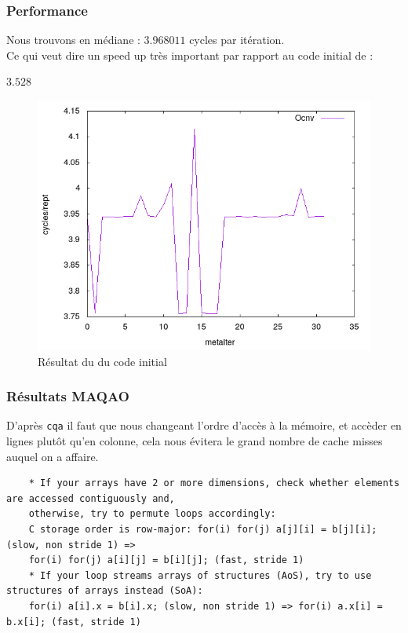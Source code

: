 \documentclass{report}
\begin{document}
  \subsubsection{Performance}
  Nous trouvons en médiane : $3.968011$ cycles par itération.\\
  Ce qui veut dire un speed up très important par rapport au code initial de :
  \begin{center}
      $3.528$
  \end{center}
  \begin{figure}[ht!]
    \centering
    \includegraphics[scale=0.45]{../metarep/Ocnv.png}
    \caption{Résultat du du code initial}
  \end{figure}
  \subsubsection{Résultats MAQAO}
  D'après \texttt{cqa} il faut que nous changeant l'ordre d'accès à la mémoire, et accèder en lignes
  plutôt qu'en colonne, cela nous évitera le grand nombre de cache misses auquel on a affaire.
  \begin{verbatim}
    * If your arrays have 2 or more dimensions, check whether elements are accessed contiguously and,
    otherwise, try to permute loops accordingly:
    C storage order is row-major: for(i) for(j) a[j][i] = b[j][i]; (slow, non stride 1) =>
    for(i) for(j) a[i][j] = b[i][j]; (fast, stride 1)
    * If your loop streams arrays of structures (AoS), try to use structures of arrays instead (SoA):
    for(i) a[i].x = b[i].x; (slow, non stride 1) => for(i) a.x[i] = b.x[i]; (fast, stride 1)

  \end{verbatim}
\end{document}
